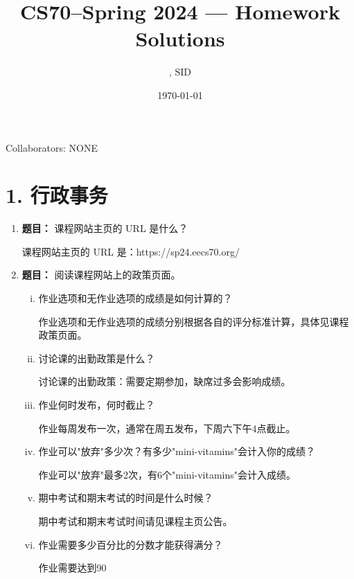 \documentclass[11pt]{article}
\title{CS70--Spring 2024 --- Homework \Homework Solutions}
\author{\Name, SID \SID}
\date{\today}
\newenvironment{qparts}{\begin{enumerate}[{(}a{)}]}{\end{enumerate}}
\begin{document}
\maketitle

Collaborators: NONE

\section*{1. 行政事务}
\begin{qparts}
\item \textbf{题目：} 课程网站主页的 URL 是什么？

课程网站主页的 URL 是：https://sp24.eecs70.org/

\item \textbf{题目：} 阅读课程网站上的政策页面。

\begin{enumerate}[(i)]
\item 作业选项和无作业选项的成绩是如何计算的？

作业选项和无作业选项的成绩分别根据各自的评分标准计算，具体见课程政策页面。

\item 讨论课的出勤政策是什么？

讨论课的出勤政策：需要定期参加，缺席过多会影响成绩。

\item 作业何时发布，何时截止？

作业每周发布一次，通常在周五发布，下周六下午4点截止。

\item 作业可以"放弃"多少次？有多少"mini-vitamins"会计入你的成绩？

作业可以"放弃"最多2次，有6个"mini-vitamins"会计入成绩。

\item 期中考试和期末考试的时间是什么时候？

期中考试和期末考试时间请见课程主页公告。

\item 作业需要多少百分比的分数才能获得满分？

作业需要达到90%
\end{enumerate}
\end{qparts}

\newpage
\end{document}
